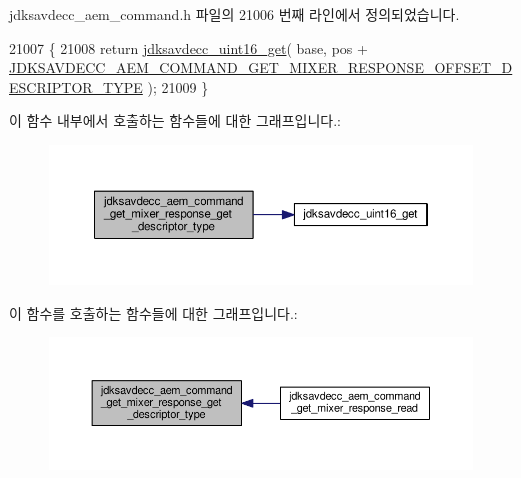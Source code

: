jdksavdecc\+\_\+aem\+\_\+command.\+h 파일의 21006 번째 라인에서 정의되었습니다.


\begin{DoxyCode}
21007 \{
21008     \textcolor{keywordflow}{return} \hyperlink{group__endian_ga3fbbbc20be954aa61e039872965b0dc9}{jdksavdecc\_uint16\_get}( base, pos + 
      \hyperlink{group__command__get__mixer__response_gae9ce9c8d301514057dab15b3251b83f3}{JDKSAVDECC\_AEM\_COMMAND\_GET\_MIXER\_RESPONSE\_OFFSET\_DESCRIPTOR\_TYPE}
       );
21009 \}
\end{DoxyCode}


이 함수 내부에서 호출하는 함수들에 대한 그래프입니다.\+:
\nopagebreak
\begin{figure}[H]
\begin{center}
\leavevmode
\includegraphics[width=350pt]{group__command__get__mixer__response_ga6b02459783e82a2dce9c62d2a67b37f6_cgraph}
\end{center}
\end{figure}




이 함수를 호출하는 함수들에 대한 그래프입니다.\+:
\nopagebreak
\begin{figure}[H]
\begin{center}
\leavevmode
\includegraphics[width=350pt]{group__command__get__mixer__response_ga6b02459783e82a2dce9c62d2a67b37f6_icgraph}
\end{center}
\end{figure}


